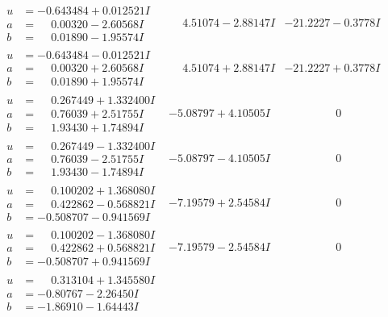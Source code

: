 \documentclass[1p]{elsarticle_modified}
\theoremstyle{definition}
\begin{document}
$$\begin{array}{c|c|c}
\begin{aligned}
u &= -0.643484 + 0.012521 I \\
a &= \phantom{-}0.00320 - 2.60568 I \\
b &= \phantom{-}0.01890 - 1.95574 I\end{aligned}
 & \phantom{-}4.51074 - 2.88147 I & -21.2227 - 0.3778 I \\ \hline\begin{aligned}
u &= -0.643484 - 0.012521 I \\
a &= \phantom{-}0.00320 + 2.60568 I \\
b &= \phantom{-}0.01890 + 1.95574 I\end{aligned}
 & \phantom{-}4.51074 + 2.88147 I & -21.2227 + 0.3778 I \\ \hline\begin{aligned}
u &= \phantom{-}0.267449 + 1.332400 I \\
a &= \phantom{-}0.76039 + 2.51755 I \\
b &= \phantom{-}1.93430 + 1.74894 I\end{aligned}
 & -5.08797 + 4.10505 I & \phantom{-0.000000 } 0 \\ \hline\begin{aligned}
u &= \phantom{-}0.267449 - 1.332400 I \\
a &= \phantom{-}0.76039 - 2.51755 I \\
b &= \phantom{-}1.93430 - 1.74894 I\end{aligned}
 & -5.08797 - 4.10505 I & \phantom{-0.000000 } 0 \\ \hline\begin{aligned}
u &= \phantom{-}0.100202 + 1.368080 I \\
a &= \phantom{-}0.422862 - 0.568821 I \\
b &= -0.508707 - 0.941569 I\end{aligned}
 & -7.19579 + 2.54584 I & \phantom{-0.000000 } 0 \\ \hline\begin{aligned}
u &= \phantom{-}0.100202 - 1.368080 I \\
a &= \phantom{-}0.422862 + 0.568821 I \\
b &= -0.508707 + 0.941569 I\end{aligned}
 & -7.19579 - 2.54584 I & \phantom{-0.000000 } 0 \\ \hline\begin{aligned}
u &= \phantom{-}0.313104 + 1.345580 I \\
a &= -0.80767 - 2.26450 I \\
b &= -1.86910 - 1.64443 I\end{aligned}

\end{array}$$
\end{document}
